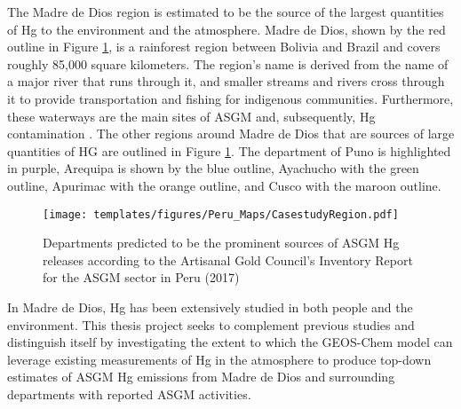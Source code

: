 \begin{flushleft}
The Madre de Dios region is estimated to be the source of the largest quantities of Hg to the environment and the atmosphere\cite{agc_reporte_2017}. Madre de Dios, shown by the red outline in Figure \ref{fig:PeruCS}, is a rainforest region between Bolivia and Brazil and covers roughly 85,000 square kilometers. The region's name is derived from the name of a major river that runs through it, and smaller streams and rivers cross through it to provide transportation and fishing for indigenous communities. Furthermore, these waterways are the main sites of ASGM and, subsequently, Hg contamination \cite{ashe_elevated_2012,agc_reporte_2017}. The other regions around Madre de Dios that are sources of large quantities of HG are outlined in Figure \ref{fig:PeruCS}. The department of Puno is highlighted in purple, Arequipa is shown by the blue outline, Ayachucho with the green outline, Apurimac with the orange outline, and Cusco with the maroon outline.
\begin{figure}[H]
  \texttt{[image: templates/figures/Peru\_Maps/CasestudyRegion.pdf]}
  \centering
  \caption{Departments predicted to be the prominent sources of ASGM Hg releases according to the Artisanal Gold Council's  Inventory Report for the ASGM sector in Peru (2017) }
  \label{fig:PeruCS}
\end{figure}
\FloatBarrier

In Madre de Dios, Hg has been extensively studied in both people and the environment. This thesis project seeks to complement previous studies and distinguish itself  by investigating the extent to which the GEOS-Chem model can leverage existing measurements of Hg in the atmosphere to produce top-down estimates of ASGM Hg emissions from Madre de Dios and surrounding departments with reported ASGM activities.

\end{flushleft}
